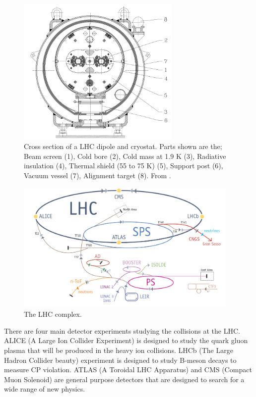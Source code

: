 \begin{figure}[htbp]
  \centering
  \includegraphics[width=0.7\textwidth]{lhcdipole.png}
  \caption{Cross section of a LHC dipole and cryostat. Parts shown are the; Beam
screen (1), Cold bore (2), Cold mass at 1.9 K (3),
Radiative insulation (4), Thermal shield (55 to 75 K) (5),
Support post (6), Vacuum vessel (7), Alignment target (8). From \cite{lyn}.}
  \label{fig:lhcdipole}
\end{figure}

\begin{figure}[htbp]
  \centering
  \includegraphics[width=0.96\textwidth]{accelerators.png}
  \caption{The LHC complex.}
  \label{fig:LHCcomplex}
\end{figure}

There are four main detector experiments studying the collisions at the LHC. 
ALICE (A Large Ion Collider Experiment) is designed to study the quark gluon
plasma that will be produced in the heavy ion collisions. 
LHCb (The Large Hadron Collider beauty) experiment is designed to study B-meson
decays to measure CP violation. 
ATLAS (A Toroidal LHC Apparatus) and CMS (Compact Muon Solenoid) are general
purpose detectors that are designed 
to search for a wide range of new physics.\cite{lhc}

